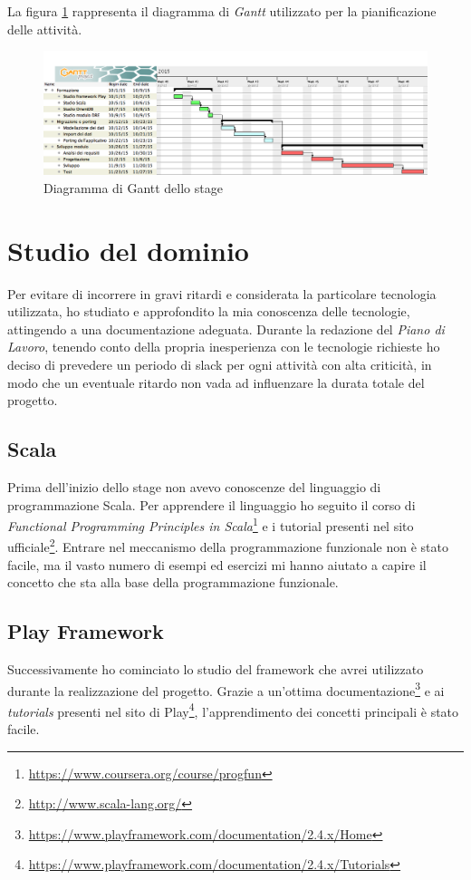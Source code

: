 La figura \ref{fig:ScreenShot2016-01-06at17} rappresenta il diagramma di \textit{Gantt} utilizzato per la pianificazione delle attività.
\begin{figure}[h]
\centering
\includegraphics[width=1.2\linewidth, height=0.45\textheight]{"immagini/piano-di-lavoro"}
\caption[Diagramma di Gantt dello stage]{Diagramma di Gantt dello stage}
\label{fig:ScreenShot2016-01-06at17}
\end{figure}


\newpage
\section{Studio del dominio}
Per evitare di incorrere in gravi ritardi e considerata la particolare tecnologia utilizzata, ho studiato e approfondito la mia conoscenza delle tecnologie, attingendo a una documentazione adeguata. Durante la redazione del \textit{Piano di Lavoro}, tenendo conto della propria inesperienza con le tecnologie richieste ho deciso di prevedere un periodo di \gls{slack} per ogni attività con alta criticità, in modo che un eventuale ritardo non vada ad influenzare la durata totale del progetto.


\subsection*{Scala}
Prima dell'inizio dello stage non avevo conoscenze del linguaggio di programmazione Scala. Per apprendere il linguaggio ho seguito il corso di \textit{Functional Programming Principles in Scala}\footnote{\url{https://www.coursera.org/course/progfun}} e i tutorial presenti nel sito ufficiale\footnote{\url{http://www.scala-lang.org/}}. Entrare nel meccanismo della programmazione funzionale non è stato facile, ma il vasto numero di esempi ed esercizi mi hanno aiutato a capire il concetto che sta alla base della programmazione funzionale.

\subsection*{Play Framework}
Successivamente ho cominciato lo studio del \gls{framework} che avrei utilizzato durante la realizzazione del progetto. Grazie a un'ottima documentazione\footnote{\url{https://www.playframework.com/documentation/2.4.x/Home}} e ai \textit{tutorials} presenti nel sito di Play\footnote{\url{https://www.playframework.com/documentation/2.4.x/Tutorials}}, l'apprendimento dei concetti principali è stato facile.

